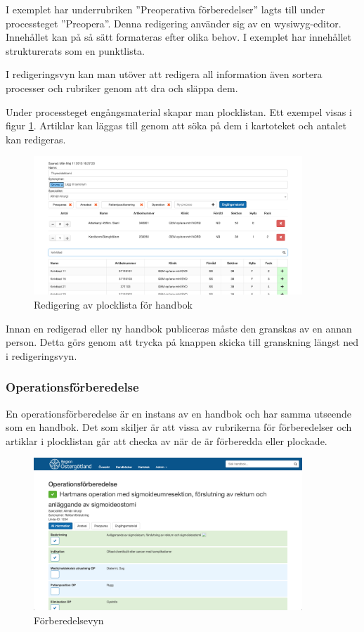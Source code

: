 I exemplet har underrubriken ''Preoperativa förberedelser'' lagts till under processteget ''Preopera''. Denna redigering använder sig av en wysiwyg-editor. Innehållet kan på så sätt formateras efter olika behov. I exemplet har innehållet strukturerats som en punktlista. 

I redigeringsvyn kan man utöver att redigera all information även sortera processer och rubriker genom att dra och släppa dem.

Under processteget engångsmaterial skapar man plocklistan. Ett exempel visas i figur \ref{fig:plocklistaredigering2}. Artiklar kan läggas till genom att söka på dem i kartoteket och antalet kan redigeras.

\begin{figure}
  \centering
  \includegraphics[width=0.9\textwidth]{images/site/plocklistaredigering2}
  \caption{Redigering av plocklista för handbok}
  \label{fig:plocklistaredigering2}
\end{figure}


Innan en redigerad eller ny handbok publiceras måste den granskas av en annan person. Detta görs genom att trycka på knappen skicka till granskning längst ned i redigeringsvyn.

\subsubsection{Operationsförberedelse}
En operationsförberedelse är en instans av en handbok och har samma utseende som en handbok.
Det som skiljer är att vissa av rubrikerna för förberedelser och artiklar i plocklistan går att checka av när de är förberedda eller plockade.

\begin{figure}
  \centering
  \includegraphics[width=0.9\textwidth]{images/site/op}
  \caption{Förberedelsevyn}
  \label{fig:op}
\end{figure}

